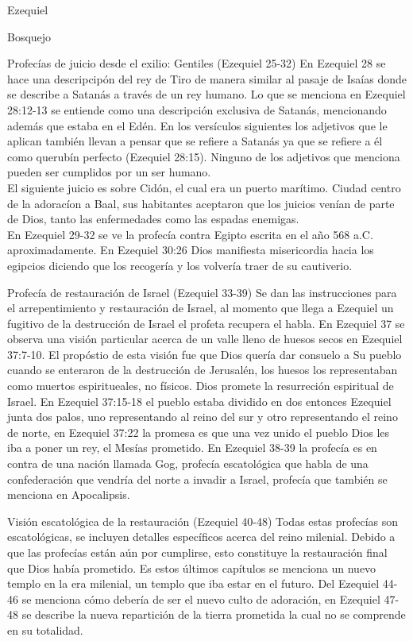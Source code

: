 \begin{section}{Ezequiel}
\begin{subsection}{Bosquejo}
\begin{subsubsection}{Profecías de juicio desde el exilio: Gentiles (Ezequiel 25-32)}
En Ezequiel 28 se hace una descripcipón del rey de Tiro de manera similar al pasaje de Isaías donde se describe a Satanás a través de un rey humano. Lo que se menciona en Ezequiel 28:12-13 se entiende como una descripción exclusiva de Satanás, mencionando además que estaba en el Edén. En los versículos siguientes los adjetivos que le aplican también llevan a pensar que se refiere a Satanás ya que se refiere a él como querubín perfecto (Ezequiel 28:15). Ninguno de los adjetivos que menciona pueden ser cumplidos por un ser humano.\\
  El siguiente juicio es sobre Cidón, el cual era un puerto marítimo. Ciudad centro de la adoracíon a Baal, sus habitantes aceptaron que los juicios venían de parte de Dios, tanto las enfermedades como las espadas enemigas.\\
  En Ezequiel 29-32 se ve la profecía contra Egipto escrita en el año 568 a.C. aproximadamente. En Ezequiel 30:26 Dios manifiesta misericordia hacia los egipcios diciendo que los recogería y los volvería traer de su cautiverio. 
  \end{subsubsection}
  \begin{subsubsection}{Profecía de restauración de Israel (Ezequiel 33-39)}
	  Se dan las instrucciones para el arrepentimiento y restauración de Israel, al momento que llega a Ezequiel un fugitivo de la destrucción de Israel el profeta recupera el habla. En Ezequiel 37 se observa una visión particular acerca de un valle lleno de huesos secos en Ezequiel 37:7-10. El propóstio de esta visión fue que Dios quería dar consuelo a Su pueblo cuando se enteraron de la destrucción de Jerusalén, los huesos los representaban como muertos espiritueales, no físicos. Dios promete la resurreción espiritual de Israel. En Ezequiel 37:15-18 el pueblo estaba dividido en dos entonces Ezequiel junta dos palos, uno representando al reino del sur y otro representando el reino de norte, en Ezequiel 37:22 la promesa es que una vez unido el pueblo Dios les iba a poner un rey, el Mesías prometido. En Ezequiel 38-39 la profecía es en contra de una nación llamada Gog, profecía escatológica que habla de una confederación que vendría del norte a invadir a Israel, profecía que también se menciona en Apocalipsis. \\
  \end{subsubsection}
  \begin{subsubsection}{Visión escatológica de la restauración (Ezequiel 40-48)}
Todas estas profecías son escatológicas, se incluyen detalles específicos acerca del reino milenial. Debido a que las profecías están aún por cumplirse, esto constituye la restauración final que Dios había prometido. Es estos últimos capítulos se menciona un nuevo templo en la era milenial, un templo que iba estar en el futuro. Del Ezequiel 44-46 se menciona cómo debería de ser el nuevo culto de adoración, en Ezequiel 47-48 se describe la nueva repartición de la tierra prometida la cual no se comprende en su totalidad.

	\end{subsubsection}
\end{subsection}
\end{section}
%



